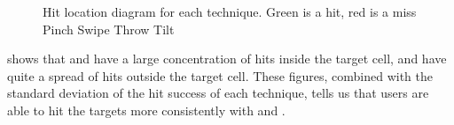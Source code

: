 \begin{figure}[H]
	\caption{
		Hit location diagram for each technique. Green is a hit, red is a miss
		\protect{} Pinch
		\protect{} Swipe
		\protect{} Throw
		\protect{} Tilt
	}
	\label{fig:thitboxes}
\end{figure}

 shows that \swipe and \throw have a large concentration of hits inside the target cell, \pinch and \tilt have quite a spread of hits outside the target cell. These figures, combined with the standard deviation of the hit success of each technique, tells us that users are able to hit the targets more consistently with \swipe and \throw.

